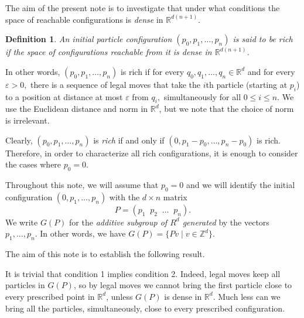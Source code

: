 \documentclass{article}
\newtheorem{theorem}{Theorem}[section]
\theoremstyle{definition}
\newtheorem{definition}[theorem]{Definition}
\newcommand{\R}{\mathbb R}
\newcommand{\Z}{\mathbb Z}
\begin{document}
The aim of the present note is to investigate that under what conditions the space of reachable configurations is \emph{dense} in $\R^{d(n+1)}$.
\medskip

\begin{definition} \emph{An initial particle configuration $(p_0, p_1, \ldots, p_n)$ is said to be \emph{rich} if the space of configurations reachable from it is \emph{dense} in $\R^{d(n+1)}$.}
\end{definition}

In other words, $(p_0, p_1, \ldots, p_n)$ is rich if for every $q_0, q_1,\ldots, q_n\in\R^d$ and for every $\varepsilon>0,$ there is a sequence of legal moves that take the $i$\/th particle (starting at $p_i$) to a position at distance at most $\varepsilon$ from $q_i,$ simultaneously for all $0\le i\le n$. We use the Euclidean distance and norm in $\R^d$, but we note that the choice of norm is irrelevant.

Clearly, $(p_0, p_1, \ldots, p_n)$ is \emph{rich} if and only if $(0,p_1-p_0,\ldots, p_n-p_0)$ is rich. Therefore, in order to characterize all rich configurations, it is enough to consider the cases where $p_0=0$.

Throughout this note, we will assume that $p_0=0$ and we will identify the initial configuration $(0,p_1,\ldots,p_n)$ with the $d\times n$ matrix
$$P=(p_1\;\;p_2\;\;\dots\;\;p_n).$$
We write $G(P)$ for the \emph{additive subgroup of $R^d$ generated} by the vectors $p_1,\ldots,p_n$. In other words, we have $G(P)=\{Pv\mid v\in\Z^d\}$.

\smallskip

The aim of this note is to establish the following result.


It is trivial that condition 1 implies condition 2. Indeed, legal moves keep all particles in $G(P)$, so by legal moves we cannot bring the first particle close to every prescribed point in $\R^d$, unless $G(P)$ is dense in $\R^d$. Much less can we bring all the particles, simultaneously, close to every prescribed configuration.
\end{document}
